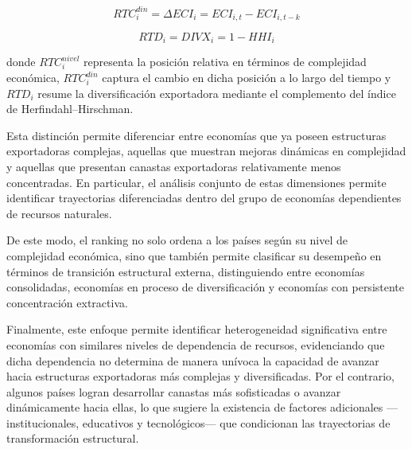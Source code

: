 \documentclass[../../PTFM.tex]{subfiles}
\begin{document}
	\begin{equation}
		RTC_i^{din} = \Delta ECI_i = ECI_{i,t} - ECI_{i,t-k}
	\end{equation}

	\begin{equation}
		RTD_i = DIVX_i = 1-HHI_i
	\end{equation}

	donde $RTC_i^{nivel}$ representa la posición relativa en términos de complejidad económica, $RTC_i^{din}$ captura el cambio en dicha posición a lo largo del tiempo y $RTD_i$ resume la diversificación exportadora mediante el complemento del índice de Herfindahl--Hirschman.
	
	Esta distinción permite diferenciar entre economías que ya poseen estructuras exportadoras complejas, aquellas que muestran mejoras dinámicas en complejidad y aquellas que presentan canastas exportadoras relativamente menos concentradas. En particular, el análisis conjunto de estas dimensiones permite identificar trayectorias diferenciadas dentro del grupo de economías dependientes de recursos naturales.
	
	De este modo, el ranking no solo ordena a los países según su nivel de complejidad económica, sino que también permite clasificar su desempeño en términos de transición estructural externa, distinguiendo entre economías consolidadas, economías en proceso de diversificación y economías con persistente concentración extractiva.
	
	Finalmente, este enfoque permite identificar heterogeneidad significativa entre economías con similares niveles de dependencia de recursos, evidenciando que dicha dependencia no determina de manera unívoca la capacidad de avanzar hacia estructuras exportadoras más complejas y diversificadas. Por el contrario, algunos países logran desarrollar canastas más sofisticadas o avanzar dinámicamente hacia ellas, lo que sugiere la existencia de factores adicionales ---institucionales, educativos y tecnológicos--- que condicionan las trayectorias de transformación estructural.
	
	
\end{document}

